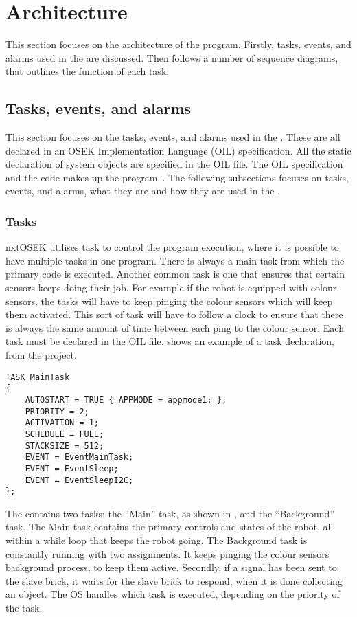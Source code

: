 \section{Architecture} \label{sec:architecture}
This section focuses on the architecture of the program. Firstly, tasks, events, and alarms used in the \projname{} are discussed. Then follows a number of sequence diagrams, that outlines the function of each task. 


\subsection{Tasks, events, and alarms} \label{sec:task-events-alarms}
This section focuses on the tasks, events, and alarms used in the \projname{}. These are all declared in an OSEK Implementation Language (OIL) specification. All the static declaration of system objects are specified in the OIL file. The OIL specification and the code makes up the program~\citep{nxtOSEK2}. The following subsections focuses on tasks, events, and alarms, what they are and how they are used in the \projname{}.

\subsubsection{Tasks} \label{sec:tasks}
nxtOSEK utilises task to control the program execution, where it is possible to have multiple tasks in one program. There is always a main task from which the primary code is executed. Another common task is one that ensures that certain sensors keeps doing their job. For example if the robot is equipped with colour sensors, the tasks will have to keep pinging the colour sensors which will keep them activated. This sort of task will have to follow a clock to ensure that there is always the same amount of time between each ping to the colour sensor. Each task must be declared in the OIL file.  shows an example of a task declaration, from the \projname{} project. 

\begin{lstlisting}[caption= An example of a task used in the \projname{}, label=lst:taskexample]
TASK MainTask
{
    AUTOSTART = TRUE { APPMODE = appmode1; };
    PRIORITY = 2;
    ACTIVATION = 1;
    SCHEDULE = FULL;
    STACKSIZE = 512;
    EVENT = EventMainTask;
    EVENT = EventSleep;
    EVENT = EventSleepI2C;
};
\end{lstlisting}

The \projname{} contains two tasks: the ``Main'' task, as shown in , and the ``Background'' task. The Main task contains the primary controls and states of the robot, all within a while loop that keeps the robot going. The Background task is constantly running with two assignments. It keeps pinging the colour sensors background process, to keep them active. Secondly, if a signal has been sent to the slave brick, it waits for the slave brick to respond, when it is done collecting an object. The OS handles which task is executed, depending on the priority of the task. 


